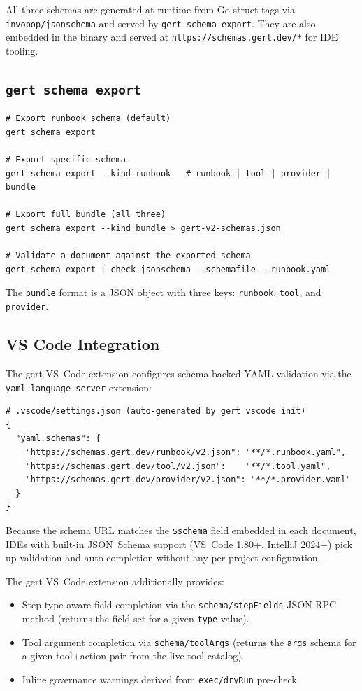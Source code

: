 All three schemas are generated at runtime from Go struct tags via
\texttt{invopop/jsonschema} and served by \texttt{gert schema export}.
They are also embedded in the binary and served at
\texttt{https://schemas.gert.dev/*} for IDE tooling.

\subsection{\texttt{gert schema export}}

\begin{verbatim}
# Export runbook schema (default)
gert schema export

# Export specific schema
gert schema export --kind runbook   # runbook | tool | provider | bundle

# Export full bundle (all three)
gert schema export --kind bundle > gert-v2-schemas.json

# Validate a document against the exported schema
gert schema export | check-jsonschema --schemafile - runbook.yaml
\end{verbatim}

The \texttt{bundle} format is a JSON object with three keys:
\texttt{runbook}, \texttt{tool}, and \texttt{provider}.

\subsection{VS Code Integration}

The gert VS~Code extension configures schema-backed YAML validation via the
\texttt{yaml-language-server} extension:

\begin{verbatim}
# .vscode/settings.json (auto-generated by gert vscode init)
{
  "yaml.schemas": {
    "https://schemas.gert.dev/runbook/v2.json": "**/*.runbook.yaml",
    "https://schemas.gert.dev/tool/v2.json":    "**/*.tool.yaml",
    "https://schemas.gert.dev/provider/v2.json": "**/*.provider.yaml"
  }
}
\end{verbatim}

Because the schema URL matches the \texttt{\$schema} field embedded in each
document, IDEs with built-in JSON~Schema support (VS~Code 1.80+, IntelliJ 2024+)
pick up validation and auto-completion without any per-project configuration.

The gert VS~Code extension additionally provides:
\begin{itemize}
  \item Step-type-aware field completion via the \texttt{schema/stepFields}
        JSON-RPC method (returns the field set for a given \texttt{type} value).
  \item Tool argument completion via \texttt{schema/toolArgs} (returns the
        \texttt{args} schema for a given tool+action pair from the live tool
        catalog).
  \item Inline governance warnings derived from \texttt{exec/dryRun} pre-check.
\end{itemize}

